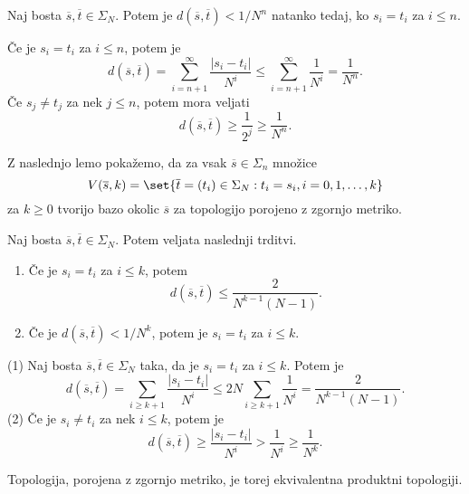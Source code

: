 \begin{izrek} \label{thm:blizu}
    Naj bosta \(\overline{s}, \overline{t} \in \Sigma_N\). Potem je \(d(\overline{s}, \overline{t}) < 1/N^n\) natanko tedaj, ko \(s_i = t_i\) za \(i \leq n\).
\end{izrek}

\begin{dokaz}
    Če je \(s_i = t_i\) za \(i \leq n\), potem je
    \[d(\overline{s}, \overline{t}) = \sum_{i = n + 1}^{\infty} \frac{|s_i - t_i|}{N^i} \leq \sum_{i = n + 1}^{\infty} \frac{1}{N^i} = \frac{1}{N^n}.\]
    Če \(s_j \neq t_j\) za nek \(j \leq n\), potem mora veljati
    \[d(\overline{s}, \overline{t}) \geq \frac{1}{2^j} \geq \frac{1}{N^n}.\]
\end{dokaz}

\noindent Z naslednjo lemo pokažemo, da za vsak \(\overline{s} \in \Sigma_n\) množice
\[V(\overline{s}, k) = \set{\overline{t} = (t_i) \in \Sigma_N : t_i = s_i, i = 0, 1, \dots, k}\]
za \(k \geq 0\) tvorijo bazo okolic \(\overline{s}\) za topologijo porojeno z zgornjo metriko.

\begin{lema} \label{lem:seq-metric}
    Naj bosta \(\overline{s}, \overline{t} \in \Sigma_N\). Potem veljata naslednji trditvi.
    \begin{enumerate}[label=(\arabic*)]
        \item Če je \(s_i = t_i\) za \(i \leq k\), potem \[d (\overline{s}, \overline{t}) \leq \frac{2}{N^{k - 1} (N - 1)}.\]
        \item Če je \(d (\overline{s}, \overline{t}) < 1 / N^k\), potem je \(s_i = t_i\) za \(i \leq k\).
    \end{enumerate}
\end{lema}

\begin{dokaz}
    (1) Naj bosta \(\overline{s}, \overline{t} \in \Sigma_N\) taka, da je \(s_i = t_i\) za \(i \leq k\). Potem je
    \[d (\overline{s}, \overline{t}) = \sum_{i \geq k + 1} \frac{|s_i - t_i|}{N^i} \leq 2 N \sum_{i \geq k + 1} \frac{1}{N^i} = \frac{2}{N^{k - 1} (N - 1)}.\]
    (2) Če je \(s_i \neq t_i\) za nek \(i \leq k\), potem je
    \[d (\overline{s}, \overline{t}) \geq \frac{|s_i - t_i|}{N^i} > \frac{1}{N^i} \geq \frac{1}{N^k}.\]
\end{dokaz}

\noindent Topologija, porojena z zgornjo metriko, je torej ekvivalentna produktni topologiji.

